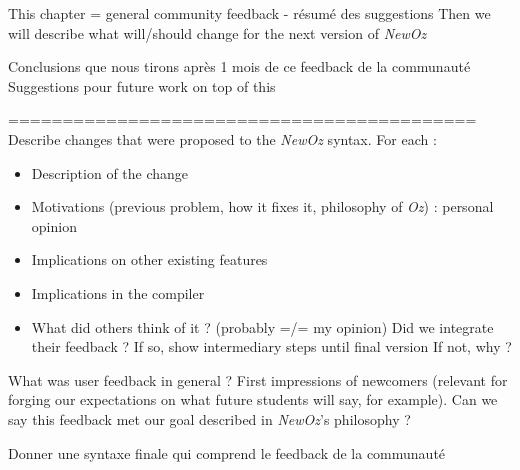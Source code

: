 

This chapter = general community feedback - résumé des suggestions
Then we will describe what will/should change for the next version of \textit{NewOz}

Conclusions que nous tirons après 1 mois de ce feedback de la communauté
Suggestions pour future work on top of this

===========================================
Describe changes that were proposed to the \textit{NewOz} syntax.
For each :
\begin{itemize}
    \item Description of the change
    \item Motivations (previous problem, how it fixes it, philosophy of \textit{Oz}) : personal opinion
    \item Implications on other existing features
    \item Implications in the compiler
    \item What did others think of it ? (probably =/= my opinion)
    Did we integrate their feedback ?
    If so, show intermediary steps until final version
    If not, why ?
\end{itemize}

What was user feedback in general ?
First impressions of newcomers (relevant for forging our expectations on what future students will say, for example).
Can we say this feedback met our goal described in \textit{NewOz}'s philosophy ?

Donner une syntaxe finale qui comprend le feedback de la communauté